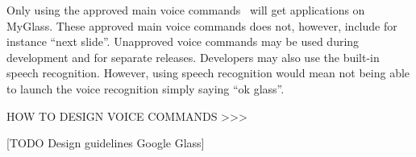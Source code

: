 Only using the approved main voice commands~\cite{existingVoiceCommands} will get applications on MyGlass. These approved main voice commands does not, however, include for instance ``next slide''. Unapproved voice commands may be used during development and for separate releases. Developers may also use the built-in speech recognition. However, using speech recognition would mean not being able to launch the voice recognition simply saying ``ok glass''.


HOW TO DESIGN VOICE COMMANDS >>> \cite{glassVoiceChecklist}

[TODO Design guidelines Google Glass]